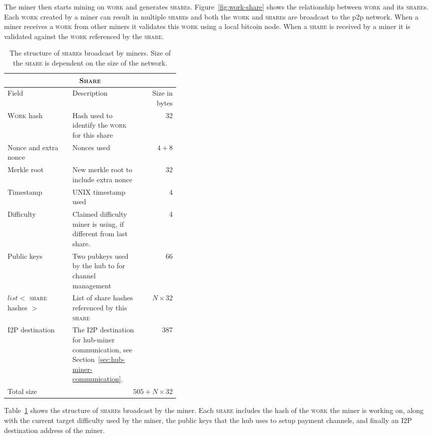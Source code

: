 \documentclass{article}
\begin{document}
The miner then starts mining on \textsc{work} and generates
\textsc{share}s. Figure~\ref{fig:work-share} shows the relationship
between \textsc{work} and its \textsc{share}s. Each \textsc{work}
created by a miner can result in multiple \textsc{share}s and both the
\textsc{work} and \textsc{share}s are broadcast to the p2p
network. When a miner receives a \textsc{work} from other miners it
validates this \textsc{work} using a local bitcoin node. When a
\textsc{share} is received by a miner it is validated against the
\textsc{work} referenced by the \textsc{share}.

\begin{table}
  \centering
  \begin{tabular}{ |l|p{0.4\linewidth}|r| }
    \hline
    \multicolumn{3}{|c|}{\textsc{Share}} \\
    \hline
    Field & Description & Size in bytes \\
    \hline
    \textsc{Work} hash & Hash used to identify the \textsc{work} for this share & 32 \\
    \hline
    Nonce and extra nonce & Nonces used & $4+8$ \\
    \hline
    Merkle root & New merkle root to include extra nonce & 32 \\
    \hline
    Timestamp & UNIX timestamp used & 4 \\
    \hline
    Difficulty & Claimed difficulty miner is using, if different from last share. & 4 \\
    \hline
    Public keys & Two pubkeys used by the hub to for channel management & 66 \\
    \hline
    $list<$ \textsc{share} hashes $>$ & List of share hashes referenced by this \textsc{share} & $N \times 32$ \\
    \hline
    I2P destination & The I2P destination for hub-miner communication, see Section~\ref{sec:hub-miner-communication}. & 387 \\
    \hline
    Total size & \multicolumn{2}{|r|}{$505 + N \times 32$} \\
    \hline
  \end{tabular}
  \caption{The structure of \textsc{share}s broadcast by miners. Size
    of the \textsc{share} is dependent on the size of the
    network.}\label{table:share}
\end{table}


Table~\ref{table:share} shows the structure of \textsc{share}s
broadcast by the miner. Each \textsc{share} includes the hash of the
\textsc{work} the miner is working on, along with the current target
difficulty used by the miner, the public keys that the hub uses to
setup payment channels, and finally an I2P destination address of the
miner.
\end{document}
